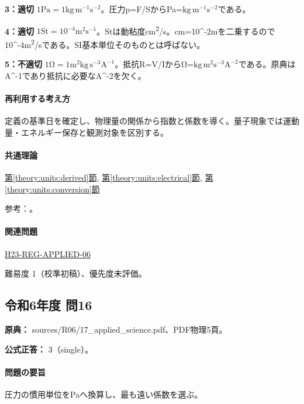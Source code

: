 \noindent\textbf{3：適切} \(1\mathrm{Pa}=1\mathrm{kg\,m^{-1}s^{-2}}\)。圧力p=\allowbreak{}F/SからPa=\(\mathrm{kg\,m^{-1}s^{-2}}\)である。\par

\noindent\textbf{4：適切} \(1\mathrm{St}=10^{-4}\mathrm{m^2s^{-1}}\)。Stは動粘度cm\textsuperscript{2}/s。cm=\allowbreak{}10\textasciicircum{}-2mを二乗するので10\textasciicircum{}-4m\textsuperscript{2}/sである。SI基本単位そのものとは呼ばない。\par

\noindent\textbf{5：不適切} \(1\mathrm{\Omega}=1\mathrm{m^2kg\,s^{-3}A^{-1}}\)。抵抗R=\allowbreak{}V/IからΩ=\(\mathrm{kg\,m^2s^{-3}A^{-2}}\)である。原典はA\textasciicircum{}-1であり抵抗に必要なA\textasciicircum{}-2を欠く。\par

\paragraph{再利用する考え方} 定義の基準日を確定し、物理量の関係から指数と係数を導く。量子現象では運動量・エネルギー保存と観測対象を区別する。

\paragraph{共通理論} \hyperref[theory:units:derived]{第\ref*{theory:units:derived}節}, \hyperref[theory:units:electrical]{第\ref*{theory:units:electrical}節}, \hyperref[theory:units:conversion]{第\ref*{theory:units:conversion}節}

\par 参考：\cite{si_nist811}。

\paragraph{関連問題} \hyperref[q:h23-reg-applied-06]{H23-REG-APPLIED-06}

\par 難易度 1（校準初稿）、優先度未評価。

\subsection{令和6年度 問16}
\label{q:r06-reg-applied-16}

\noindent\textbf{原典：} sources/R06/17\_applied\_science.pdf、PDF物理5頁。

\textbf{公式正答：} 3（single）。

\paragraph{問題の要旨} 圧力の慣用単位をPaへ換算し、最も遠い係数を選ぶ。


